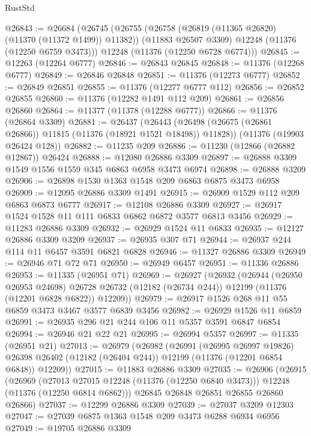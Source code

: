 \begin{lexlean}{RustStd}
\begin{coremodule}
{\begin{coremodule}
{{{{{{{{{{{{{{{{{{{{{{{{{{{{{{{{{{{{{{{{{{{{{{{{{{{{{{{{{{{{{{{{{{{{{{{{{{{{{{{{{{{{{@26843 := @26684
    (@26745
      (@26755
        (@26758 (@26819 (@11365 @26820) (@11370 (@11372 @1499)) @11382))
        (@11883 @26507 @3309)
        @12248
        (@11376 (@12250 @6759 @3473)))
      @12248
      (@11376 (@12250 @6728 @6774)))
@26845 := @12263 (@12264 @6777)
@26846 := @26843 @26845
@26848 := @11376 (@12268 @6777)
@26849 := @26846 @26848
@26851 := @11376 (@12273 @6777)
@26852 := @26849 @26851
@26855 := @11376 (@12277 @6777 @112)
@26856 := @26852 @26855
@26860 := @11376 (@12282 @1491 @112 @209)
@26861 := @26856 @26860
@26864 := @11377 (@11378 (@12288 @6777))
@26866 := @11376 (@26864 @3309)
@26881 := @26437
    (@26443 (@26498 (@26675 (@26861 @26866)) @11815 (@11376 (@18921 @1521 @18498)) @11828))
    (@11376 (@19903 @26424 @128))
@26882 := @11235 @209
@26886 := @11230 (@12866 (@26882 @12867)) @26424
@26888 := @12080 @26886 @3309
@26897 := @26888 @3309 @1549 @1556 @1559 @345 @6863 @6958 @3473 @6974
@26898 := @26888 @3209
@26906 := @26898 @1530 @1363 @1548 @209 @6863 @6875 @3473 @6958
@26909 := @12095 @26886 @3309 @1491
@26915 := @26909 @1529 @112 @209 @6863 @6873 @6777
@26917 := @12108 @26886 @3309
@26927 := @26917 @1524 @1528 @11 @111 @6833 @6862 @6872 @3577 @6813 @3456
@26929 := @11283 @26886 @3309
@26932 := @26929 @1524 @11 @6833
@26935 := @12127 @26886 @3309 @3209
@26937 := @26935 @307 @71
@26944 := @26937 @244 @114 @11 @6457 @3591 @6821 @6828
@26946 := @11327 @26886 @3309
@26949 := @26946 @71 @72 @71
@26950 := @26949 @6457
@26951 := @11336 @26886
@26953 := @11335 (@26951 @71)
@26969 := @26927
    (@26932
      (@26944
        (@26950 @26953 @24698)
        @26728
        @26732
        (@12182 (@26734 @244))
        @12199
        (@11376 (@12201 @6828 @6822))
        @12209))
@26979 := @26917 @1526 @268 @11 @55 @6859 @3473 @3467 @3577 @6839 @3456
@26982 := @26929 @1526 @11 @6859
@26991 := @26935 @296 @21 @244 @106 @11 @5357 @3591 @6847 @6854
@26994 := @26946 @21 @22 @21
@26995 := @26994 @5357
@26997 := @11335 (@26951 @21)
@27013 := @26979
    (@26982
      (@26991
        (@26995 @26997 @19826)
        @26398
        @26402
        (@12182 (@26404 @244))
        @12199
        (@11376 (@12201 @6854 @6848))
        @12209))
@27015 := @11883 @26886 @3309
@27035 := @26906
    (@26915
      (@26969
        (@27013 @27015 @12248 (@11376 (@12250 @6840 @3473)))
        @12248
        (@11376 (@12250 @6814 @6862)))
      @26845
      @26848
      @26851
      @26855
      @26860
      @26866)
@27037 := @12299 @26886 @3309
@27039 := @27037 @3209 @12303
@27047 := @27039 @6875 @1363 @1548 @209 @3473 @6288 @6934 @6956
@27049 := @19705 @26886 @3309
}}}}}}}}}}}}}}}}}}}}}}}}}}}}}}}}}}}}}}}}}}}}}}}}}}}}}}}}}}}}}}}}}}}}}}}}}}}}}}}}}}}}}
\end{coremodule}}
\end{coremodule}
\end{lexlean}
